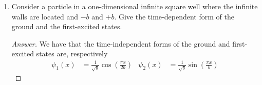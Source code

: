 \documentclass[../psets.tex]{subfiles}
\begin{document}
\begin{enumerate}
\begin{enumerate}
        \item Evaluate these uncertainties for a particle in the second- and fourth-excited states (the first and second even excited states) of an infinite square well. Do they satisfy the Heisenberg uncertainty relation?
        \begin{proof}[Answer]
            From \textcite{bib:McQuarrieSimon}, we have that
            \begin{align*}
                \Delta x &= \frac{a}{2\pi\cdot 3}\sqrt{\frac{\pi^2\cdot 3^2}{3}-2}&
                \Delta p &= \frac{3\cdot\pi\hbar}{a}\\
                \Delta x &= \frac{a}{2\pi\cdot 5}\sqrt{\frac{\pi^2\cdot 5^2}{3}-2}&
                \Delta p &= \frac{5\cdot\pi\hbar}{a}
            \end{align*}
            These  obey the Heisenberg uncertainty relation since
            \begin{align*}
                \Delta x\cdot\Delta p &= \frac{\hbar}{2}\sqrt{\frac{\pi^2\cdot 3^2}{3}-2} \geq \frac{\hbar}{2}\\
                \Delta x\cdot\Delta p &= \frac{\hbar}{2}\sqrt{\frac{\pi^2\cdot 5^2}{3}-2} \geq \frac{\hbar}{2}
            \end{align*}
        \end{proof}
        \item Compare the uncertainties in the position and momentum for the ground, second-excited, and fourth-excited states. What would you expect to happen to the uncertainties as the state $n$ approaches infinity?
        \begin{proof}[Answer]
            As $n\to\infty$, uncertainty in position will stay basically the same (increase slightly asymptotically), but uncertainty in momentum will diverge to $\infty$.
        \end{proof}
    \end{enumerate}
    \item Consider a particle in a one-dimensional infinite square well where the infinite walls are located and $-b$ and $+b$. Give the time-dependent form of the ground and the first-excited states.
    \begin{proof}[Answer]
        We have that the time-independent forms of the ground and first-excited states are, respectively
        \begin{align*}
            \psi_1(x) &= \frac{1}{\sqrt{b}}\cos\left( \frac{\pi x}{2b} \right)&
            \psi_2(x) &= \frac{1}{\sqrt{b}}\sin\left( \frac{\pi x}{b} \right)

\end{align*}
\end{proof}
\end{enumerate}
\end{document}
